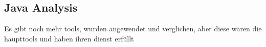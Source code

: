 \subsection{Java Analysis} \label{subsection:forensics-tools-java}





Es gibt noch mehr tools, wurden angewendet und verglichen, aber diese waren die haupttools und haben ihren dienst erfüllt
